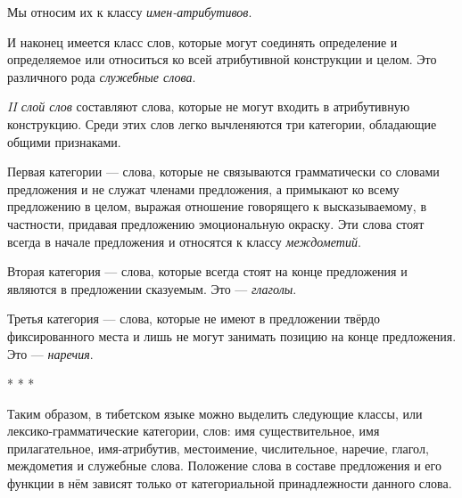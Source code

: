 Мы относим их к классу \emph{имен-атрибутивов}.

И наконец имеется класс слов, которые могут соединять определение и определяемое или относиться ко всей атрибутивной конструкции и целом. Это различного рода \emph{служебные слова}.

\emph{II слой слов} составляют слова, которые не могут входить в атрибутивную конструкцию. Среди этих слов легко вычленяются три категории, обладающие общими признаками.

Первая категории --- слова, которые не связываются грамматически со словами предложения и не служат членами предложения, а примыкают ко всему предложению в целом, выражая отношение говорящего к высказываемому, в частности, придавая предложению эмоциональную окраску. Эти слова стоят всегда в начале предложения и относятся к классу \emph{междометий}.

Вторая категория --- слова, которые всегда стоят на конце предложения и являются в предложении сказуемым. Это --- \emph{глаголы}.

Третья категория --- слова, которые не имеют в предложении твёрдо фиксированного места и лишь не могут занимать позицию на конце предложения. Это --- \emph{наречия}.

\begin{center}
* * *
\end{center}

Таким образом, в тибетском языке можно выделить следующие классы, или лексико-грамматические категории, слов: имя существительное, имя прилагательное, имя-атрибутив, местоимение, числительное, наречие, глагол, междометия и служебные слова. Положение слова в составе предложения и его функции в нём зависят только от категориальной принадлежности данного слова.